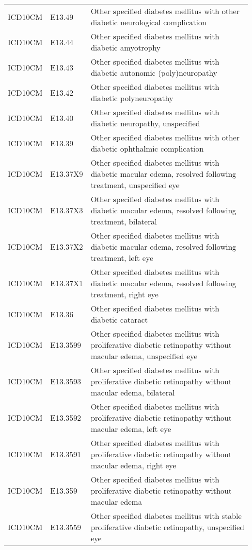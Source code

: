 \begin{table}[ht]
\begin{tabular}{lll}
  ICD10CM & E13.49 & Other specified diabetes mellitus with other diabetic neurological complication \\ 
  ICD10CM & E13.44 & Other specified diabetes mellitus with diabetic amyotrophy \\ 
  ICD10CM & E13.43 & Other specified diabetes mellitus with diabetic autonomic (poly)neuropathy \\ 
  ICD10CM & E13.42 & Other specified diabetes mellitus with diabetic polyneuropathy \\ 
  ICD10CM & E13.40 & Other specified diabetes mellitus with diabetic neuropathy, unspecified \\ 
  ICD10CM & E13.39 & Other specified diabetes mellitus with other diabetic ophthalmic complication \\ 
  ICD10CM & E13.37X9 & Other specified diabetes mellitus with diabetic macular edema, resolved following treatment, unspecified eye \\ 
  ICD10CM & E13.37X3 & Other specified diabetes mellitus with diabetic macular edema, resolved following treatment, bilateral \\ 
  ICD10CM & E13.37X2 & Other specified diabetes mellitus with diabetic macular edema, resolved following treatment, left eye \\ 
  ICD10CM & E13.37X1 & Other specified diabetes mellitus with diabetic macular edema, resolved following treatment, right eye \\ 
  ICD10CM & E13.36 & Other specified diabetes mellitus with diabetic cataract \\ 
  ICD10CM & E13.3599 & Other specified diabetes mellitus with proliferative diabetic retinopathy without macular edema, unspecified eye \\ 
  ICD10CM & E13.3593 & Other specified diabetes mellitus with proliferative diabetic retinopathy without macular edema, bilateral \\ 
  ICD10CM & E13.3592 & Other specified diabetes mellitus with proliferative diabetic retinopathy without macular edema, left eye \\ 
  ICD10CM & E13.3591 & Other specified diabetes mellitus with proliferative diabetic retinopathy without macular edema, right eye \\ 
  ICD10CM & E13.359 & Other specified diabetes mellitus with proliferative diabetic retinopathy without macular edema \\ 
  ICD10CM & E13.3559 & Other specified diabetes mellitus with stable proliferative diabetic retinopathy, unspecified eye \\ 

\end{tabular}
\end{table}
